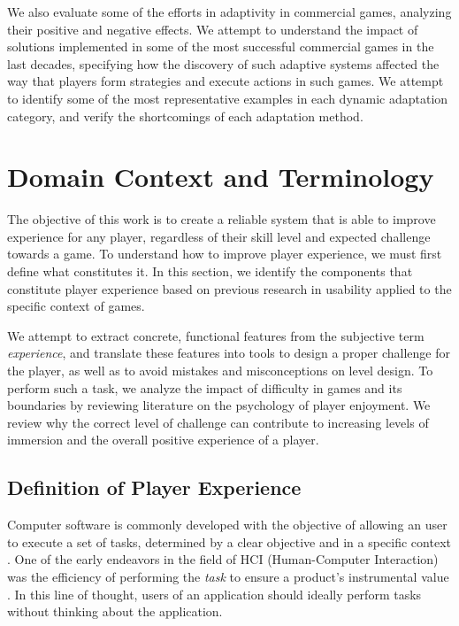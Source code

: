 We also evaluate some of the efforts in adaptivity in commercial games, analyzing their positive and negative effects. We attempt to understand the impact of solutions implemented in some of the most successful commercial games in the last decades, specifying how the discovery of such adaptive systems affected the way that players form strategies and execute actions in such games. We attempt to identify some of the most representative examples in each dynamic adaptation category, and verify the shortcomings of each adaptation method.


\section{Domain Context and Terminology}

The objective of this work is to create a reliable system that is able to improve experience for any player, regardless of their skill level and expected challenge towards a game. To understand how to improve player experience, we must first define what constitutes it. In this section, we identify the components that constitute player experience based on previous research in usability applied to the specific context of games. 

We attempt to extract concrete, functional features from the subjective term \emph{experience}, and translate these features into tools to design a proper challenge for the player, as well as to avoid mistakes and misconceptions on level design. To perform such a task, we analyze the impact of difficulty in games and its boundaries by reviewing literature on the psychology of player enjoyment. We review why the correct level of challenge can contribute to increasing levels of immersion and the overall positive experience of a player.

\subsection{Definition of Player Experience}

Computer software is commonly developed with the objective of allowing an user to execute a set of tasks, determined by a clear objective and in a specific context \cite{ARTICLE_FromUsabilityToPlayability}. One of the early endeavors in the field of HCI (Human-Computer Interaction) was the efficiency of performing the \emph{task} to ensure a product's instrumental value \cite{ARTICLE_UserExperienceAResearchAgenda}. In this line of thought, users of an application should ideally perform tasks without thinking about the application. 

